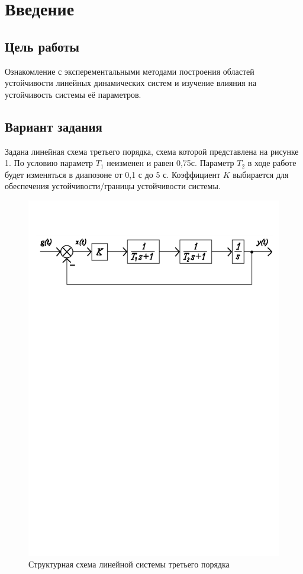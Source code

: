 \documentclass[a4paper, 11pt, russian]{article}
\begin{document}
    
    \section{Введение}
    \subsection{Цель работы}
    Ознакомление с эксперементальными методами построения областей устойчивости линейных динамических систем и изучение влияния на устойчивость системы её параметров.
    \subsection{Вариант задания}
    Задана линейная схема третьего порядка, схема которой представлена на рисунке 1. По условию параметр $T_1$ неизменен и равен 0,75с. Параметр $T_2$ в ходе работе будет изменяться в диапозоне от 0,1 с до 5 с. Коэффициент $K$ выбирается для обеспечения устойчивости/границы устойчивости системы.
    \begin{figure}[h!]
        \centering
        \includegraphics[scale = 0.8]{structureScheme}
        \caption{Структурная схема линейной системы третьего порядка}
    \end{figure}
    \clearpage
\end{document}
